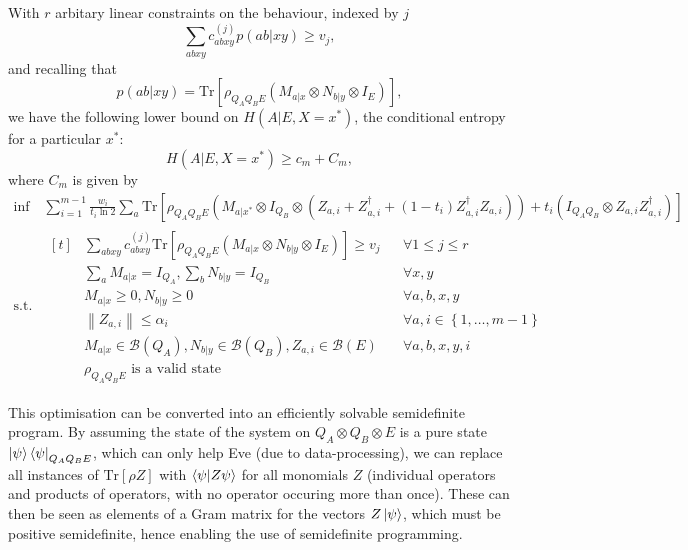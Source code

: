 \documentclass[10pt, a4paper]{article}
\numberwithin{equation}{section} %
\theoremstyle{definition}
\theoremstyle{plain}
\newcommand{\norm}[1]{\left\lVert#1\right\rVert}
\newcommand{\dintv}[2]{\left\{#1,\ldots,#2\right\}}
\newcommand{\?}{\mathrel{?}} %
\newcommand{\Tr}{\mathrm{Tr}} %
\newcommand{\sB}{\mathcal{B}}
\begin{document}
      With \(r\) arbitary linear constraints on the behaviour, indexed by \(j\)
      \[ \sum_{abxy} c^{(j)}_{abxy} p(ab|xy) \geq v_j, \]
      and recalling that
      \[ p(ab|xy) = \Tr\left[\rho_{Q_A Q_B E} \left(M_{a|x} \otimes N_{b|y} \otimes I_{E}\right) \right], \]
      we have the following lower bound on \(H(A|E, X=x^*)\), the conditional entropy for a particular \(x^*\):
      \begin{equation}
        H(A|E, X=x^*) \geq c_m + C_m,
      \end{equation}
      where \(C_m\) is given by
      \begin{align}
        \inf & \sum_{i=1}^{m-1} \frac{w_i}{t_i \ln 2} \sum_a \Tr\left[ \rho_{Q_A Q_B E} \left(M_{a|x^*} \otimes I_{Q_B} \otimes \left( Z_{a,i} + Z_{a,i}^{\dagger} + (1-t_i)  Z_{a,i}^{\dagger}Z_{a,i}\right) \right) + t_i \left( I_{Q_A Q_B} \otimes Z_{a,i}Z_{a,i}^{\dagger}\right)\right] \\
        \text{s.t.} & \begin{aligned}[t] 
          & \sum_{abxy} c^{(j)}_{abxy} \Tr\left[\rho_{Q_A Q_B E} \left(M_{a|x} \otimes N_{b|y} \otimes I_{E}\right) \right] \geq v_j & & \forall 1 \leq j \leq r \\
          & \sum_{a} M_{a|x} = I_{Q_A}, \sum_{b} N_{b|y} = I_{Q_B} & & \forall x, y \\
          & M_{a|x} \geq 0, N_{b|y} \geq 0 & & \forall a, b, x, y \\
          & \norm{Z_{a,i}} \leq \alpha_i & & \forall a, i \in \dintv{1}{m-1} \\
          & M_{a|x} \in \sB(Q_A), N_{b|y} \in \sB(Q_B), Z_{a,i} \in \sB(E) & & \forall a, b, x, y, i \\
          & \rho_{Q_A Q_B E} \text{ is a valid state} & &
        \end{aligned}
      \end{align}

      This optimisation can be converted into an efficiently solvable semidefinite program. By assuming the state of the system on \(Q_A \otimes Q_B \otimes E\) is a pure state \(\ket{\psi}\bra{\psi}_{Q_A Q_B E}\), which can only help Eve (due to data-processing), we can replace all instances of \(\Tr\left[\rho Z\right]\) with \(\braket{\psi|Z\psi}\) for all monomials \(Z\) (individual operators and products of operators, with no operator occuring more than once). These can then be seen as elements of a Gram matrix for the vectors \(Z\ket{\psi}\), which must be positive semidefinite, hence enabling the use of semidefinite programming.
\end{document}
